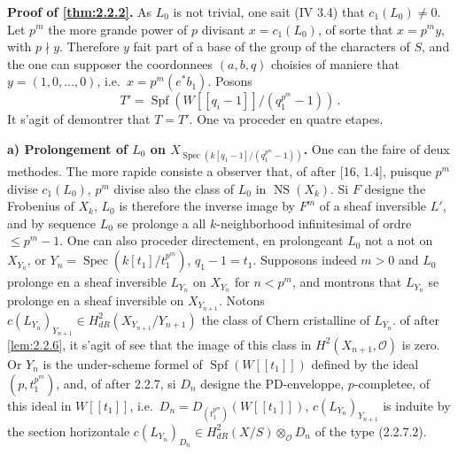 \documentclass[12pt,a4paper]{article}
\theoremstyle{plain}
\theoremstyle{definition}
\theoremstyle{remark}
\DeclareMathOperator{\Spf}{Spf}
\DeclareMathOperator{\Spec}{Spec}
\DeclareMathOperator{\NS}{NS}
\begin{document}
\subsubsection{}

\textbf{Proof of \ref{thm:2.2.2}.} As $L_0$ is not trivial, one sait (IV 3.4) that $c_1(L_0) \neq 0$. Let $p^m$ the more grande power of $p$ divisant $x = c_1(L_0)$, of sorte that $x = p^my$, with $p \nmid y$. Therefore $y$ fait part of a base of the group of the characters of $S$, and the one can supposer the coordonnees $(a, b, q)$ choisies of maniere that $y = (1, 0, \ldots, 0)$, i.e.\ $x = p^m(e^*b_1)$. Posons
\[
T' = \Spf(W[[q_i - 1]]/(q_1^{p^m} - 1))\,.\]
It s'agit of demontrer that $T = T'$. One va proceder en quatre etapes.

\textbf{a) Prolongement of $L_0$ on $X_{\Spec(k[q_1-1]/(q_1^{p^m}-1))}$.} One can the faire of deux methodes. The more rapide consiste a observer that, of after [16, 1.4], puisque $p^m$ divise $c_1(L_0)$, $p^m$ divise also the class of $L_0$ in $\NS(X_k)$. Si $F$ designe the Frobenius of $X_k$, $L_0$ is therefore the inverse image by $F^m$ of a sheaf inversible $L'$, and by sequence $L_0$ se prolonge a all $k$-neighborhood infinitesimal of ordre $\leq p^m - 1$. One can also proceder directement, en prolongeant $L_0$ not a not on $X_{Y_n}$, or $Y_n = \Spec(k[t_1]/t_1^{p^m})$, $q_1 - 1 = t_1$. Supposons indeed $m > 0$ and $L_0$ prolonge en a sheaf inversible $L_{Y_n}$ on $X_{Y_n}$ for $n < p^m$, and montrons that $L_{Y_n}$ se prolonge en a sheaf inversible on $X_{Y_{n+1}}$. Notons $c(L_{Y_n})_{Y_{n+1}} \in H_{dR}^2(X_{Y_{n+1}}/Y_{n+1})$ the class of Chern cristalline of $L_{Y_n}$. of after \ref{lem:2.2.6}, it s'agit of see that the image of this class in $H^2(X_{n+1}, \mathcal{O})$ is zero. Or $Y_n$ is the under-scheme formel of $\Spf(W[[t_1]])$ defined by the ideal $(p, t_1^{p^m})$, and, of after 2.2.7, si $D_n$ designe the PD-enveloppe, $p$-completee, of this ideal in $W[[t_1]]$, i.e.\ $D_n = D_{(t_1^{p^m})}(W[[t_1]])$, $c(L_{Y_n})_{Y_{n+1}}$ is induite by the section horizontale $c(L_{Y_n})_{D_n} \in H_{dR}^2(X/S) \otimes_\mathcal{O} D_n$ of the type (2.2.7.2).
\end{document}
